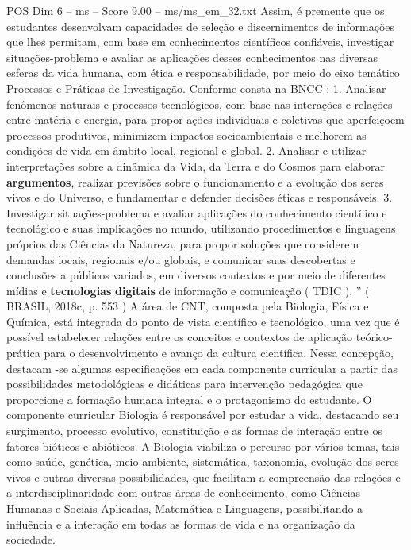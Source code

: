 \begin{textsample}{POS Dim 6 – ms – Score 9.00 – ms/ms\_em\_32.txt}
Assim, é premente que os estudantes desenvolvam capacidades de seleção e discernimentos de informações que lhes permitam, com base em conhecimentos científicos confiáveis, investigar situações-problema e avaliar as aplicações desses conhecimentos nas diversas esferas da vida humana, com ética e responsabilidade, por meio do eixo temático Processos e Práticas de Investigação.
Conforme consta na BNCC : 1.
Analisar fenômenos naturais e processos tecnológicos, com base nas interações e relações entre matéria e energia, para propor ações individuais e coletivas que aperfeiçoem processos produtivos, minimizem impactos socioambientais e melhorem as condições de vida em âmbito local, regional e global. 2.
Analisar e utilizar interpretações sobre a dinâmica da Vida, da Terra e do Cosmos para elaborar \textbf{argumentos}, realizar previsões sobre o funcionamento e a evolução dos seres vivos e do Universo, e fundamentar e defender decisões éticas e responsáveis. 3.
Investigar situações-problema e avaliar aplicações do conhecimento científico e tecnológico e suas implicações no mundo, utilizando procedimentos e linguagens próprios das Ciências da Natureza, para propor soluções que considerem demandas locais, regionais e/ou globais, e comunicar suas descobertas e conclusões a públicos variados, em diversos contextos e por meio de diferentes mídias e \textbf{tecnologias} \textbf{digitais} de informação e comunicação ( TDIC ). ” ( BRASIL, 2018c, p. 553 ) A área de CNT, composta pela Biologia, Física e Química, está integrada do ponto de vista científico e tecnológico, uma vez que é possível estabelecer relações entre os conceitos e contextos de aplicação teórico-prática para o desenvolvimento e avanço da cultura científica.
Nessa concepção, destacam -se algumas especificações em cada componente curricular a partir das possibilidades metodológicas e didáticas para intervenção pedagógica que proporcione a formação humana integral e o protagonismo do estudante.
O componente curricular Biologia é responsável por estudar a vida, destacando seu surgimento, processo evolutivo, constituição e as formas de interação entre os fatores bióticos e abióticos.
A Biologia viabiliza o percurso por vários temas, tais como saúde, genética, meio ambiente, sistemática, taxonomia, evolução dos seres vivos e outras diversas possibilidades, que facilitam a compreensão das relações e a interdisciplinaridade com outras áreas de conhecimento, como Ciências Humanas e Sociais Aplicadas, Matemática e Linguagens, possibilitando a influência e a interação em todas as formas de vida e na organização da sociedade.

\end{textsample}
